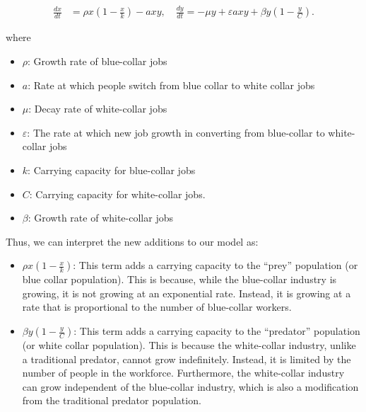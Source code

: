 \documentclass[11pt]{amsart}
\begin{document}

\begin{align}
    \frac{dx}{dt} &= \rho x \left(1-\frac{x}{k}\right) - a x y, \quad \frac{dy}{dt} = -\mu y + \varepsilon a x y + \beta y \left(1-\frac{y}{C}\right).
\end{align}

where 

\begin{itemize}
    \item $\rho$: Growth rate of blue-collar jobs
    \item $a$: Rate at which people switch from blue collar to white collar jobs
    \item $\mu$: Decay rate of white-collar jobs
    \item $\varepsilon$: The rate at which new job growth in converting from blue-collar to white-collar jobs
    \item $k$: Carrying capacity for blue-collar jobs
    \item $C$: Carrying capacity for white-collar jobs.
    \item $\beta$: Growth rate of white-collar jobs
\end{itemize}

Thus, we can interpret the new additions to our model as:

\begin{itemize}
    \item $\rho x (1-\frac{x}{k})$: This term adds a carrying capacity to the ``prey'' population (or blue collar population). This is because, while the blue-collar industry is growing, it is not growing at an exponential rate. Instead, it is growing at a rate that is proportional to the number of blue-collar workers.
    \item $\beta y (1-\frac{y}{C})$: This term adds a carrying capacity to the ``predator'' population (or white collar population). This is because the white-collar industry, unlike a traditional predator, cannot grow indefinitely. Instead, it is limited by the number of people in the workforce. Furthermore, the white-collar industry can grow independent of the blue-collar industry, which is also a modification from the traditional predator population.
\end{itemize}
\end{document}
